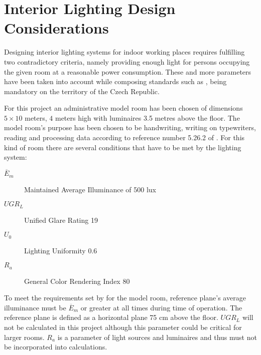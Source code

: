 \section{Interior Lighting Design Considerations}
Designing interior lighting systems for indoor working places requires fulfilling two contradictory criteria, namely providing enough light for persons occupying the given room at a reasonable power consumption. These and more parameters have been taken into account while composing standards such as \cite{CSN EN 12464-1}, being mandatory on the territory of the Czech Republic.

For this project an administrative model room has been chosen of dimensions $5 \times 10 $ meters, $4$ meters high with luminaires 3.5 metres above the floor. The model room's purpose has been chosen to be handwriting, writing on typewriters, reading and processing data according to reference number 5.26.2 of \cite{CSN EN 12464-1}. For this kind of room there are several conditions that have to be met by the lighting system:

\begin{description}
	\item[$\overline{E}_{m}$] Maintained Average Illuminance of 500 lux
	\item[$UGR_{L}$] Unified Glare Rating 19
	\item[$U_{0}$] Lighting Uniformity 0.6
	\item[$R_{a}$] General Color Rendering Index 80
\end{description}

To meet the requirements set by \cite{CSN EN 12464-1} for the model room, reference plane's average illuminance must be $\overline{E}_{m}$ or greater at all times during time of operation. The reference plane is defined as a horizontal plane 75 cm above the floor. $UGR_{L}$ will not be calculated in this project although this parameter could be critical for larger rooms. $R_{a}$ is a parameter of light sources and luminaires and thus must not be incorporated into calculations.